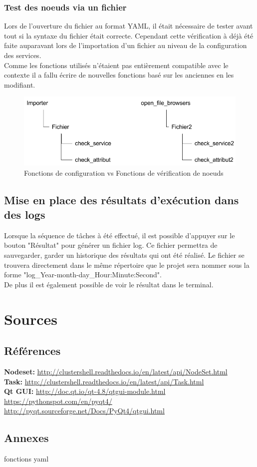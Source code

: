 \documentclass[a4paper,11pt]{article}
\begin{document}
\subsubsection{Test des noeuds via un fichier}
Lors de l'ouverture du fichier au format YAML, il était nécessaire de tester avant tout si la syntaxe du fichier était correcte. Cependant cette vérification à déjà été faite auparavant lors de l'importation d'un fichier au niveau de la configuration des services.\\
Comme les fonctions utilisés n’étaient pas entièrement compatible avec le contexte il a fallu écrire de nouvelles fonctions basé sur les anciennes en les modifiant.\\
\begin{figure}[hbtp]
\centering
\includegraphics[scale=0.5]{difference_importer_openfile.png}
\caption{Fonctions de configuration vs Fonctions de vérification de noeuds}
\end{figure}



\subsection{Mise en place des résultats d'exécution dans des logs}

Lorsque la séquence de tâches à été effectué, il est possible d'appuyer sur le bouton "Résultat" pour générer un fichier log. Ce fichier permettra de sauvegarder, garder un historique des résultats qui ont été réalisé. Le fichier se trouvera directement dans le même répertoire que le projet sera nommer sous la forme "log_Year-month-day_Hour:Minute:Second".\\
De plus il est également possible de voir le résultat dans le terminal.	
\section{Sources}
\label{sec:section6}
\subsection{Références}
\noindent\textbf{Nodeset:} \url{http://clustershell.readthedocs.io/en/latest/api/NodeSet.html}\\
\textbf{Task:} \url{http://clustershell.readthedocs.io/en/latest/api/Task.html}\\
\textbf{Qt GUI:} \url {http://doc.qt.io/qt-4.8/qtgui-module.html}\\
\url {https://pythonspot.com/en/pyqt4/}\\
\url {http://pyqt.sourceforge.net/Docs/PyQt4/qtgui.html} 

\subsection{Annexes}

fonctions yaml
\end{document}

